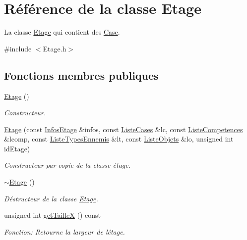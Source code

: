 \hypertarget{classEtage}{}\section{Référence de la classe Etage}
\label{classEtage}


La classe \mbox{\hyperlink{classEtage}{Etage}} qui contient des \mbox{\hyperlink{structCase}{Case}}.  




{\ttfamily \#include $<$Etage.\+h$>$}

\subsection*{Fonctions membres publiques}
\begin{DoxyCompactItemize}
\item 
\mbox{\hyperlink{classEtage_a2d0d40584e7e995f60ddda571cd79415}{Etage}} ()
\begin{DoxyCompactList}\small\item\em Constructeur. \end{DoxyCompactList}\item 
\mbox{\hyperlink{classEtage_af82cb811cba52811c621130b24383a28}{Etage}} (const \mbox{\hyperlink{structInfosEtage}{Infos\+Etage}} \&infos, const \mbox{\hyperlink{structListeCases}{Liste\+Cases}} \&lc, const \mbox{\hyperlink{structListeCompetences}{Liste\+Competences}} \&lcomp, const \mbox{\hyperlink{structListeTypesEnnemis}{Liste\+Types\+Ennemis}} \&lt, const \mbox{\hyperlink{structListeObjets}{Liste\+Objets}} \&lo, unsigned int id\+Etage)
\begin{DoxyCompactList}\small\item\em Constructeur par copie de la classe étage. \end{DoxyCompactList}\item 
\mbox{\label{classEtage_a372b6a1b5b5f0ebf48e62b09352d239a}} 
\mbox{\hyperlink{classEtage_a372b6a1b5b5f0ebf48e62b09352d239a}{$\sim$\+Etage}} ()
\begin{DoxyCompactList}\small\item\em Déstructeur de la classe \mbox{\hyperlink{classEtage}{Etage}}. \end{DoxyCompactList}\item 
unsigned int \mbox{\hyperlink{classEtage_a7edb87ab5d81a15170217960d08bc310}{get\+TailleX}} () const
\begin{DoxyCompactList}\small\item\em Fonction\+: Retourne la largeur de l\textquotesingle{}étage. \end{DoxyCompactList}\item 

\end{DoxyCompactItemize}
